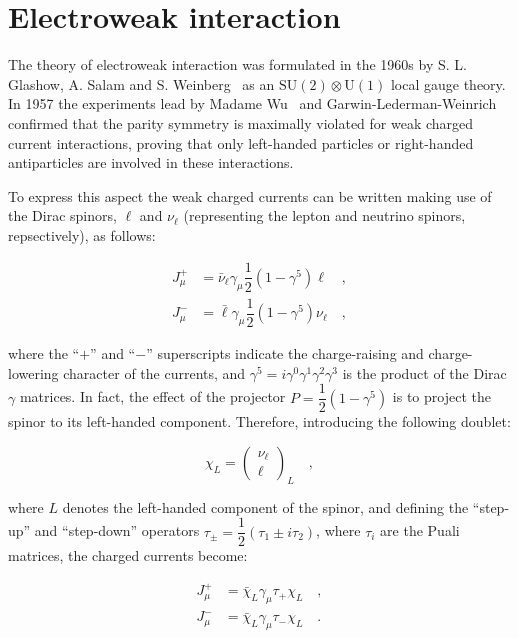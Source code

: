 \section{Electroweak interaction}
\label{sec:EW}

The theory of electroweak interaction was formulated in the 1960s by S. L. Glashow, A. Salam and S. Weinberg~\cite{Glashow:1961tr,Weinberg:1967tq} as an $\mathrm{SU(2) \otimes U(1)}$ local gauge theory.
In 1957 the experiments lead by Madame Wu~\cite{Wu:1957my} and Garwin-Lederman-Weinrich~\cite{Garwin:1957hc} confirmed that the parity symmetry is maximally violated for weak charged current interactions, proving that only left-handed particles or right-handed antiparticles are involved in these interactions. 

To express this aspect the weak charged currents can be written making use of the Dirac spinors, $\ell$ and $\nu_\ell$ (representing the lepton and neutrino spinors, repsectively), as follows:

\begin{equation}
\begin{split}
J_\mu^+ &= \bar{\nu}_\ell \gamma_\mu \dfrac{1}{2}(1-\gamma^5) \ell \quad, \\
J_\mu^- &= \bar{\ell} \gamma_\mu \dfrac{1}{2}(1-\gamma^5)\nu_\ell \quad,
\end{split}
\end{equation}

where the ``$+$'' and ``$-$'' superscripts indicate the charge-raising and charge-lowering character of the currents, and $\gamma^5 = i\gamma^0\gamma^1\gamma^2\gamma^3$ is the product of the Dirac $\gamma$ matrices. In fact, the effect of the projector $P=\dfrac{1}{2}(1-\gamma^5)$ is to project the spinor to its left-handed component. Therefore, introducing the following doublet:

\begin{equation}
\chi_L = \begin{pmatrix} \nu_\ell \\ \ell \end{pmatrix}_L \quad ,
\end{equation}

where $L$ denotes the left-handed component of the spinor, and defining the ``step-up'' and ``step-down'' operators $\tau_\pm = \dfrac{1}{2}(\tau_1 \pm i\tau_2)$, where $\tau_i$ are the Puali matrices, the charged currents become:

\begin{equation}
\begin{split}
J_\mu^+ &= \bar{\chi}_L \gamma_\mu \tau_+ \chi_L \quad, \\
J_\mu^- &= \bar{\chi}_L \gamma_\mu \tau_- \chi_L \quad.
\end{split}
\end{equation}

